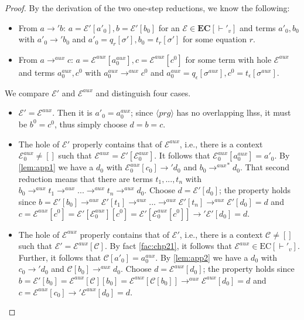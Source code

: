 \cdpaux*
\begin{proof}
By the derivation of the two one-step reductions, we know the following:
\begin{itemize}
\item From $a \longrightarrow' b$: $a = \mathcal{E}'[a'_0], b = \mathcal{E}'[b_0]$ for an $\mathcal{E} \in \mathbf{EC}[\vdash'_v]$ and terms $a'_0, b_0$ with $a'_0 \longrightarrow' b_0$ and $a'_0 = q_r[\sigma'], b_0 = t_r[\sigma']$ for some equation $r$.

\item From $a \longrightarrow^{aux} c$: $a = \mathcal{E}^{aux}[a^{aux}_0], c = \mathcal{E}^{aux}[c^0]$ for some term with hole $\mathcal{E}^{aux}$ and terms $a^{aux}_0, c^0$ with $a^{aux}_0 \longrightarrow^{aux} c^0$ and $a^{aux}_0 = q_\epsilon[\sigma^{aux}], c^0 = t_\epsilon[\sigma^{aux}]$.
\end{itemize}

We compare $\mathcal{E}'$ and $\mathcal{E}^{aux}$ and distinguish four cases.
\begin{itemize}
\item $\mathcal{E}' = \mathcal{E}^{aux}$. Then it is $a'_0 = a^{aux}_0$; since $\langle prg \rangle$ has no overlapping lhss, it must be $b^0 = c^0$, thus simply choose $d = b = c$.

\item The hole of $\mathcal{E}'$ properly contains that of $\mathcal{E}^{aux}$, i.e., there is a context $\mathcal{E}^{aux}_0 \neq []$ such that $\mathcal{E}^{aux} = \mathcal{E}'[\mathcal{E}^{aux}_0]$. It follows that $\mathcal{E}^{aux}_0[a^{aux}_0] = a'_0$. By \autoref{lem:app1} we have a $d_0$ with $\mathcal{E}^{aux}_0[c_0] \longrightarrow' d_0$ and $b_0 {\longrightarrow^{aux}}^* d_0$. That second reduction means that there are terms $t_1, ..., t_n$ with $b_0 \longrightarrow^{aux} t_1 \longrightarrow^{aux} ... \longrightarrow^{aux} t_n \longrightarrow^{aux} d_0$. Choose $d = \mathcal{E}'[d_0]$; the property holds since $b = \mathcal{E}'[b_0] \longrightarrow^{aux} \mathcal{E}'[t_1] \longrightarrow^{aux} ... \longrightarrow^{aux} \mathcal{E}'[t_n] \longrightarrow^{aux} \mathcal{E}'[d_0] = d$ and $c = \mathcal{E}^{aux}[c^0] = \mathcal{E}'[\mathcal{E}^{aux}_0][c^0] = \mathcal{E}'[\mathcal{E}^{aux}_0[c^0]] \longrightarrow' \mathcal{E}'[d_0] = d$.

\item The hole of $\mathcal{E}^{aux}$ properly contains that of $\mathcal{E}'$, i.e., there is a context $\mathcal{C} \neq []$ such that $\mathcal{E}' = \mathcal{E}^{aux}[\mathcal{C}]$. By fact \autoref{fac:chp21}, it follows that $\mathcal{E}^{aux} \in \textrm{EC}[\vdash'_v]$. Further, it follows that $\mathcal{C}[a'_0] = a^{aux}_0$. By \autoref{lem:app2} we have a $d_0$ with $c_0 \longrightarrow' d_0$ and $\mathcal{C}[b_0] \longrightarrow^{aux} d_0$. Choose $d = \mathcal{E}^{aux}[d_0]$; the property holds since $b = \mathcal{E}'[b_0] = \mathcal{E}^{aux}[\mathcal{C}][b_0] = \mathcal{E}^{aux}[\mathcal{C}[b_0]] \longrightarrow^{aux} \mathcal{E}^{aux}[d_0] = d$ and $c = \mathcal{E}^{aux}[c_0] \longrightarrow' \mathcal{E}^{aux}[d_0] = d$.


\end{itemize}
\end{proof}

